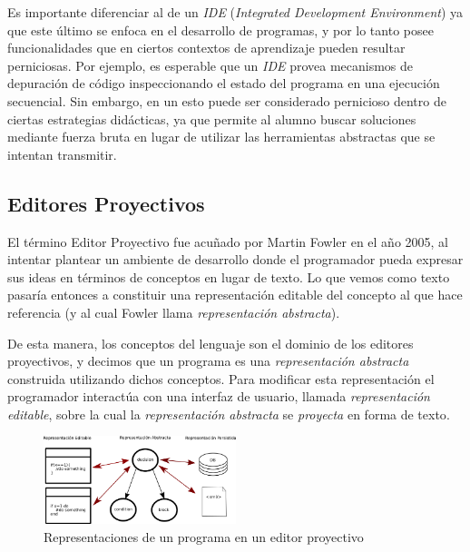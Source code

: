 Es importante diferenciar al \ile de un \textit{IDE} (\textit{Integrated Development Environment}) ya que este último se enfoca en el desarrollo de programas, y por lo tanto posee funcionalidades que en ciertos contextos de aprendizaje pueden resultar perniciosas. Por ejemplo, es esperable que un \textit{IDE} provea mecanismos de depuración de código inspeccionando el estado del programa en una ejecución secuencial. Sin embargo, en un \ile esto puede ser considerado pernicioso dentro de ciertas estrategias didácticas, ya que permite al alumno buscar soluciones mediante fuerza bruta en lugar de utilizar las herramientas abstractas que se intentan transmitir.

\subsection{Editores Proyectivos}

El término Editor Proyectivo fue acuñado por Martin Fowler en el año 2005\cite{Fowler}, al intentar plantear un ambiente de desarrollo donde el programador pueda expresar sus ideas en términos de conceptos en lugar de texto. Lo que vemos como texto pasaría entonces a constituir una representación editable del concepto al que hace referencia (y al cual Fowler llama \textit{representación abstracta}).

De esta manera, los conceptos del lenguaje son el dominio de los editores proyectivos, y decimos que un programa es una \textit{representación abstracta} construida utilizando dichos conceptos. Para modificar esta representación el programador interactúa con una interfaz de usuario, llamada \textit{representación editable}, sobre la cual la \textit{representación abstracta} se \textit{proyecta} en forma de texto\cite{voelter2014projectional}. 

\begin{figure}
  \begin{center}
    \includegraphics[width=0.5\textwidth,keepaspectratio]{assets/projectional-editor.png}
    \caption{Representaciones de un programa en un editor proyectivo}
  \end{center}
\end{figure}


